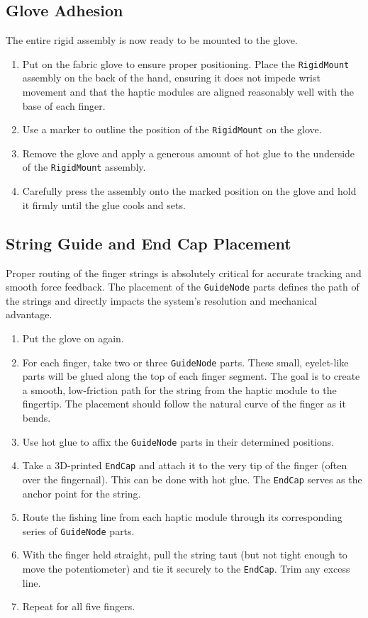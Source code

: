 \documentclass{article}
\begin{document}
\subsection{Glove Adhesion}
The entire rigid assembly is now ready to be mounted to the glove.
\begin{enumerate}
    \item Put on the fabric glove to ensure proper positioning. Place the \texttt{RigidMount} assembly on the back of the hand, ensuring it does not impede wrist movement and that the haptic modules are aligned reasonably well with the base of each finger.
    \item Use a marker to outline the position of the \texttt{RigidMount} on the glove.
    \item Remove the glove and apply a generous amount of hot glue to the underside of the \texttt{RigidMount} assembly.
    \item Carefully press the assembly onto the marked position on the glove and hold it firmly until the glue cools and sets.
\end{enumerate}

\subsection{String Guide and End Cap Placement}
Proper routing of the finger strings is absolutely critical for accurate tracking and smooth force feedback. The placement of the \texttt{GuideNode} parts defines the path of the strings and directly impacts the system's resolution and mechanical advantage.
\begin{enumerate}
    \item Put the glove on again.
    \item For each finger, take two or three \texttt{GuideNode} parts. These small, eyelet-like parts will be glued along the top of each finger segment. The goal is to create a smooth, low-friction path for the string from the haptic module to the fingertip. The placement should follow the natural curve of the finger as it bends.
    \item Use hot glue to affix the \texttt{GuideNode} parts in their determined positions.
    \item Take a 3D-printed \texttt{EndCap} and attach it to the very tip of the finger (often over the fingernail). This can be done with hot glue. The \texttt{EndCap} serves as the anchor point for the string.
    \item Route the fishing line from each haptic module through its corresponding series of \texttt{GuideNode} parts.
    \item With the finger held straight, pull the string taut (but not tight enough to move the potentiometer) and tie it securely to the \texttt{EndCap}. Trim any excess line.
    \item Repeat for all five fingers.
\end{enumerate}
\end{document}
